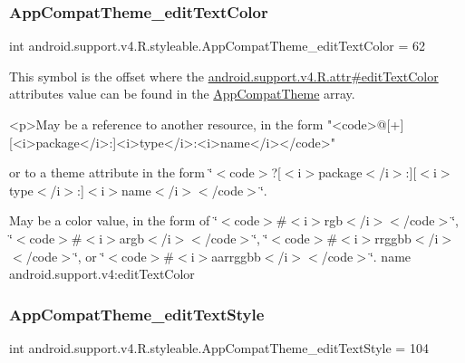 \subsubsection{\texorpdfstring{App\+Compat\+Theme\+\_\+edit\+Text\+Color}{AppCompatTheme\_editTextColor}}
{\footnotesize\ttfamily int android.\+support.\+v4.\+R.\+styleable.\+App\+Compat\+Theme\+\_\+edit\+Text\+Color = 62\hspace{0.3cm}{\ttfamily [static]}}

This symbol is the offset where the \hyperlink{classandroid_1_1support_1_1v4_1_1R_1_1attr_a1b8c77d88fd0903a7e6138e4e35cf69e}{android.\+support.\+v4.\+R.\+attr\#edit\+Text\+Color} attribute\textquotesingle{}s value can be found in the \hyperlink{classandroid_1_1support_1_1v4_1_1R_1_1styleable_ac07ebbe62ed977f6dcaadc6397840ace}{App\+Compat\+Theme} array.

\begin{DoxyVerb}      <p>May be a reference to another resource, in the form "<code>@[+][<i>package</i>:]<i>type</i>:<i>name</i></code>"
\end{DoxyVerb}
 or to a theme attribute in the form \char`\"{}$<$code$>$?\mbox{[}$<$i$>$package$<$/i$>$\+:\mbox{]}\mbox{[}$<$i$>$type$<$/i$>$\+:\mbox{]}$<$i$>$name$<$/i$>$$<$/code$>$\char`\"{}. 

May be a color value, in the form of \char`\"{}$<$code$>$\#$<$i$>$rgb$<$/i$>$$<$/code$>$\char`\"{}, \char`\"{}$<$code$>$\#$<$i$>$argb$<$/i$>$$<$/code$>$\char`\"{}, \char`\"{}$<$code$>$\#$<$i$>$rrggbb$<$/i$>$$<$/code$>$\char`\"{}, or \char`\"{}$<$code$>$\#$<$i$>$aarrggbb$<$/i$>$$<$/code$>$\char`\"{}.  name android.\+support.\+v4\+:edit\+Text\+Color \mbox{\label{classandroid_1_1support_1_1v4_1_1R_1_1styleable_acaa134c2cef3cbfff2f66851831e5bd1}} 
\subsubsection{\texorpdfstring{App\+Compat\+Theme\+\_\+edit\+Text\+Style}{AppCompatTheme\_editTextStyle}}
{\footnotesize\ttfamily int android.\+support.\+v4.\+R.\+styleable.\+App\+Compat\+Theme\+\_\+edit\+Text\+Style = 104\hspace{0.3cm}{\ttfamily [static]}}

